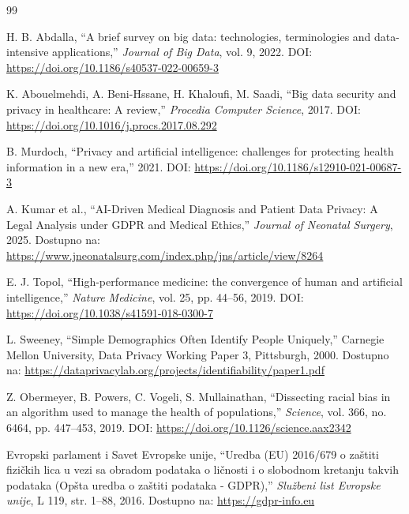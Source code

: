 \documentclass[12pt]{article}
\begin{document}
\begin{thebibliography}{99}
 
H. B. Abdalla, ``A brief survey on big data: technologies, terminologies and data-intensive applications,'' \textit{Journal of Big Data}, vol. 9, 2022. DOI: \url{https://doi.org/10.1186/s40537-022-00659-3}
 
K. Abouelmehdi, A. Beni-Hssane, H. Khaloufi, M. Saadi, ``Big data security and privacy in healthcare: A review,'' \textit{Procedia Computer Science}, 2017.  DOI: \url{https://doi.org/10.1016/j.procs.2017.08.292}
 
B. Murdoch, ``Privacy and artificial intelligence: challenges for protecting health information in a new era,'' 2021. DOI: \url{https://doi.org/10.1186/s12910-021-00687-3}
 
 
A. Kumar et al., ``AI-Driven Medical Diagnosis and Patient Data Privacy: A Legal Analysis under GDPR and Medical Ethics,'' \textit{Journal of Neonatal Surgery}, 2025. Dostupno na: 
\url{https://www.jneonatalsurg.com/index.php/jns/article/view/8264}
 
E. J. Topol, ``High-performance medicine: the convergence of human and artificial intelligence,'' \textit{Nature Medicine}, vol. 25, pp. 44--56, 2019. DOI: \url{https://doi.org/10.1038/s41591-018-0300-7}
 
L. Sweeney, ``Simple Demographics Often Identify People Uniquely,'' 
Carnegie Mellon University, Data Privacy Working Paper 3, Pittsburgh, 2000. Dostupno na: \url{https://dataprivacylab.org/projects/identifiability/paper1.pdf}
 
Z. Obermeyer, B. Powers, C. Vogeli, S. Mullainathan, ``Dissecting racial bias in an algorithm used to manage the health of populations,'' \textit{Science}, 
vol. 366, no. 6464, pp. 447--453, 2019. 
DOI: \url{https://doi.org/10.1126/science.aax2342}
 
Evropski parlament i Savet Evropske unije, ``Uredba (EU) 2016/679 o zaštiti fizičkih lica u vezi sa obradom podataka o ličnosti i o slobodnom kretanju takvih podataka (Opšta uredba o zaštiti podataka - GDPR),'' \textit{Službeni list Evropske unije}, L 119, str. 1--88, 2016. Dostupno na: \url{https://gdpr-info.eu}
 
\end{thebibliography}
 
\end{document}
